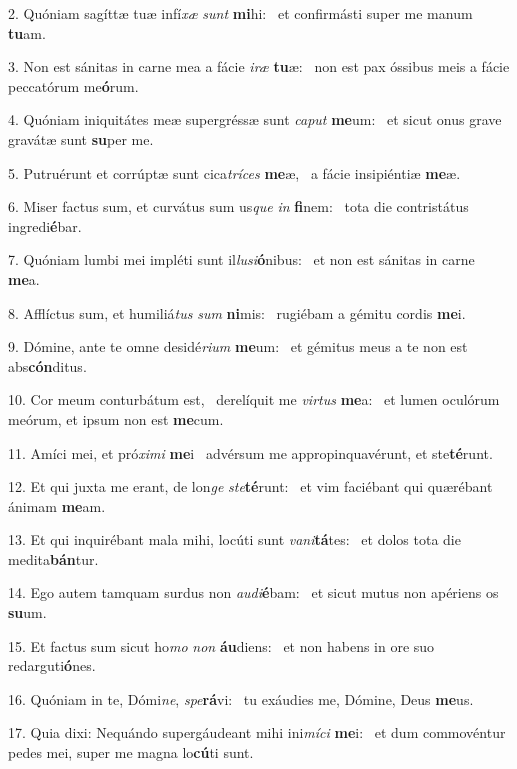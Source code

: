 2. Quóniam sagíttæ tuæ infí\textit{xæ} \textit{sunt} \textbf{mi}hi: \ast\  et confirmásti super me manum \textbf{tu}am.\

3. Non est sánitas in carne mea a fácie \textit{i}\textit{ræ} \textbf{tu}æ: \ast\  non est pax óssibus meis a fácie peccatórum me\textbf{ó}rum.\

4. Quóniam iniquitátes meæ supergréssæ sunt \textit{ca}\textit{put} \textbf{me}um: \ast\  et sicut onus grave gravátæ sunt \textbf{su}per me.\

5. Putruérunt et corrúptæ sunt cica\textit{trí}\textit{ces} \textbf{me}æ, \ast\  a fácie insipiéntiæ \textbf{me}æ.\

6. Miser factus sum, et curvátus sum us\textit{que} \textit{in} \textbf{fi}nem: \ast\  tota die contristátus ingredi\textbf{é}bar.\

7. Quóniam lumbi mei impléti sunt il\textit{lu}\textit{si}\textbf{ó}nibus: \ast\  et non est sánitas in carne \textbf{me}a.\

8. Afflíctus sum, et humiliá\textit{tus} \textit{sum} \textbf{ni}mis: \ast\  rugiébam a gémitu cordis \textbf{me}i.\

9. Dómine, ante te omne desidé\textit{ri}\textit{um} \textbf{me}um: \ast\  et gémitus meus a te non est abs\textbf{cón}ditus.\

10. Cor meum conturbátum est, \dag\  derelíquit me \textit{vir}\textit{tus} \textbf{me}a: \ast\  et lumen oculórum meórum, et ipsum non est \textbf{me}cum.\

11. Amíci mei, et pró\textit{xi}\textit{mi} \textbf{me}i \ast\  advérsum me appropinquavérunt, et ste\textbf{té}runt.\

12. Et qui juxta me erant, de lon\textit{ge} \textit{ste}\textbf{té}runt: \ast\  et vim faciébant qui quærébant ánimam \textbf{me}am.\

13. Et qui inquirébant mala mihi, locúti sunt \textit{va}\textit{ni}\textbf{tá}tes: \ast\  et dolos tota die medita\textbf{bán}tur.\

14. Ego autem tamquam surdus non \textit{au}\textit{di}\textbf{é}bam: \ast\  et sicut mutus non apériens os \textbf{su}um.\

15. Et factus sum sicut ho\textit{mo} \textit{non} \textbf{áu}diens: \ast\  et non habens in ore suo redarguti\textbf{ó}nes.\

16. Quóniam in te, Dómi\textit{ne}, \textit{spe}\textbf{rá}vi: \ast\  tu exáudies me, Dómine, Deus \textbf{me}us.\

17. Quia dixi: Nequándo supergáudeant mihi ini\textit{mí}\textit{ci} \textbf{me}i: \ast\  et dum commovéntur pedes mei, super me magna lo\textbf{cú}ti sunt.\

